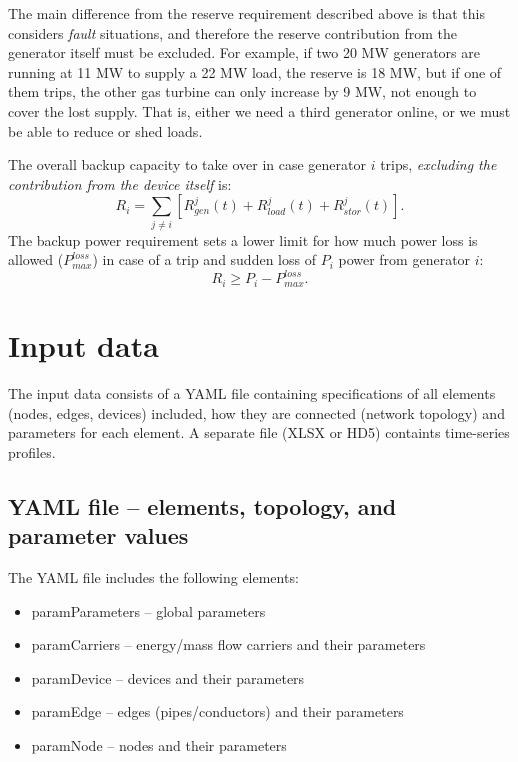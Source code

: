 \documentclass[12pt]{article}
\begin{document}
The main difference from the reserve requirement described above is that this considers \emph{fault} situations, and therefore the reserve contribution from the generator itself must be excluded. For example, if two 20 MW generators are running at 11 MW to supply a 22 MW load, the reserve is 18 MW, but if one of them trips, the other gas turbine can only increase by 9 MW, not enough to cover the lost supply. That is, either we need a third generator online, or we must be able to reduce or shed loads.


The overall backup capacity to take over in case generator $i$ trips, \emph{excluding the contribution from the device itself}  is:
\begin{equation}
 	R_{i}=  \sum _{j \neq i}^{} \left[ R_{gen}^j(t) +R_{load}^j(t) +R_{stor}^j(t) \right] . 
\end{equation}
The backup power requirement sets a lower limit for how much power loss is allowed ($P^{loss}_{max}$) in case of a trip and sudden loss of $P_i$ power from generator $i$: 
 \begin{equation}
 	R_{i}   \geq P_i - P^{loss}_{max}.
 \end{equation}



\section{Input data}
The input data consists of a YAML file containing specifications of all elements (nodes, edges, devices) included, how they are connected (network topology) and parameters for each element. A separate file (XLSX or HD5) containts time-series profiles.

\subsection{YAML file -- elements, topology, and parameter values}

The YAML file includes the following elements:
\begin{itemize}
\item paramParameters -- global parameters
\item paramCarriers -- energy/mass flow carriers and their parameters
\item paramDevice -- devices and their parameters
\item paramEdge -- edges (pipes/conductors) and their parameters
\item paramNode -- nodes and their parameters
\end{itemize}
\end{document}

